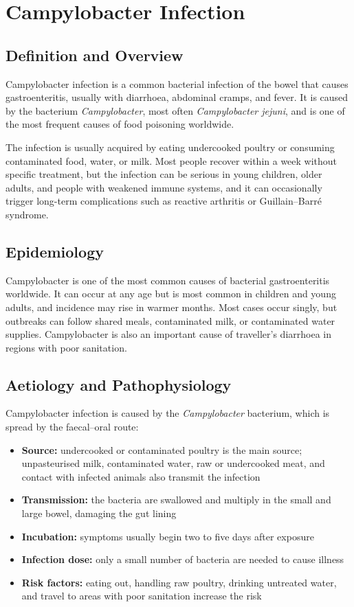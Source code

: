 \chapter{Campylobacter Infection}

\section*{Definition and Overview}
Campylobacter infection is a common bacterial infection of the bowel that causes gastroenteritis, usually with diarrhoea, abdominal cramps, and fever. It is caused by the bacterium \textit{Campylobacter}, most often \textit{Campylobacter jejuni}, and is one of the most frequent causes of food poisoning worldwide.

The infection is usually acquired by eating undercooked poultry or consuming contaminated food, water, or milk. Most people recover within a week without specific treatment, but the infection can be serious in young children, older adults, and people with weakened immune systems, and it can occasionally trigger long-term complications such as reactive arthritis or Guillain--Barré syndrome.

\section*{Epidemiology}
Campylobacter is one of the most common causes of bacterial gastroenteritis worldwide. It can occur at any age but is most common in children and young adults, and incidence may rise in warmer months. Most cases occur singly, but outbreaks can follow shared meals, contaminated milk, or contaminated water supplies. Campylobacter is also an important cause of traveller's diarrhoea in regions with poor sanitation.

\section*{Aetiology and Pathophysiology}
Campylobacter infection is caused by the \textit{Campylobacter} bacterium, which is spread by the faecal--oral route:
\begin{itemize}
    \item \textbf{Source:} undercooked or contaminated poultry is the main source; unpasteurised milk, contaminated water, raw or undercooked meat, and contact with infected animals also transmit the infection
    \item \textbf{Transmission:} the bacteria are swallowed and multiply in the small and large bowel, damaging the gut lining
    \item \textbf{Incubation:} symptoms usually begin two to five days after exposure
    \item \textbf{Infection dose:} only a small number of bacteria are needed to cause illness
    \item \textbf{Risk factors:} eating out, handling raw poultry, drinking untreated water, and travel to areas with poor sanitation increase the risk
\end{itemize}

